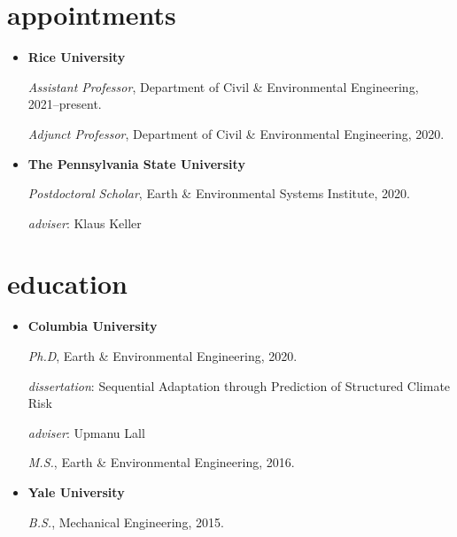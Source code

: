\documentclass[10pt,oneside]{article}
\begin{document}

\section{appointments}

\mbox{}\vspace{-\dimexpr\baselineskip\relax}

\begin{itemize}[label={}]
  
  \item \textbf{Rice University}
        
        \textit{Assistant Professor}, Department of Civil \& Environmental Engineering, 2021--present.
        
        
        \textit{Adjunct Professor}, Department of Civil \& Environmental Engineering, 2020.
        
        
  
  \item \textbf{The Pennsylvania State University}
        
        \textit{Postdoctoral Scholar}, Earth \& Environmental Systems Institute, 2020.
        
          
          \quad \textit{adviser}: Klaus Keller
          
        
        
  
\end{itemize}


\section{education}

\mbox{}\vspace{-\dimexpr\baselineskip\relax}

\begin{itemize}[label={}]
  
  \item \textbf{Columbia University}
        
        \textit{Ph.D}, Earth \& Environmental Engineering, 2020.
        
          
          \quad \textit{dissertation}: Sequential Adaptation through Prediction of Structured Climate Risk
          
          \quad \textit{adviser}: Upmanu Lall
          
        
        
        \textit{M.S.}, Earth \& Environmental Engineering, 2016.
        
        
  
  \item \textbf{Yale University}
        
        \textit{B.S.}, Mechanical Engineering, 2015.
        
        
  
\end{itemize}
\end{document}
